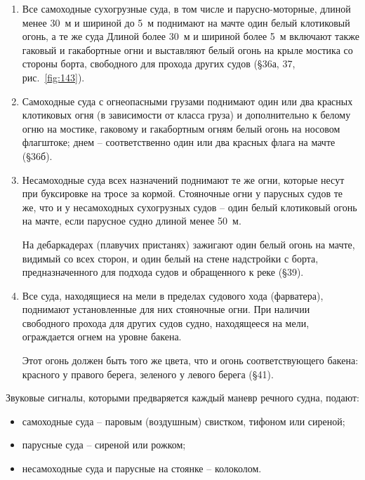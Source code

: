 \documentclass[a4paper, 12pt, twoside, final]{scrbook}
\begin{document}
\begin{enumerate}
\item Все самоходные сухогрузные суда, в том числе и парусно-моторные, длиной менее 30~м и шириной до 5~м поднимают на мачте один белый клотиковый огонь, а те же суда Длиной более 30~м и шириной более 5~м включают также гаковый и гакабортные огни и выставляют белый огонь на крыле мостика со стороны борта, свободного для прохода других судов (\S 36а, 37, рис.~\ref{fig:143}).

\item Самоходные суда с огнеопасными грузами поднимают один или два красных клотиковых огня (в зависимости от класса груза) и дополнительно к белому огню на мостике, гаковому и гакабортным огням белый огонь на носовом флагштоке; днем \--- соответственно один или два красных флага на мачте (\S 36б).

\item Несамоходные суда всех назначений поднимают те же огни, которые несут при буксировке на тросе за кормой. Стояночные огни у парусных судов те же, что и у несамоходных сухогрузных судов \--- один белый клотиковый огонь на мачте, если парусное судно длиной менее 50~м.

На дебаркадерах (плавучих пристанях) зажигают один белый огонь на мачте, видимый со всех сторон, и один белый на стене надстройки с борта, предназначенного для подхода судов и обращенного к реке (\S 39).
 
\item Все суда, находящиеся на мели в пределах судового хода (фарватера), поднимают установленные для них стояночные огни. При наличии свободного прохода для других судов судно, находящееся на мели, ограждается огнем на уровне бакена.

Этот огонь должен быть того же цвета, что и огонь соответствующего бакена: красного у правого берега, зеленого у левого берега (\S 41).
\end{enumerate}

Звуковые сигналы, которыми предваряется каждый маневр речного судна, подают:
\begin{itemize}
\item самоходные суда \--- паровым (воздушным) свистком, тифоном или сиреной;

\item парусные суда \--- сиреной или рожком;

\item несамоходные суда и парусные на стоянке \--- колоколом.

\end{itemize}
\end{document}
